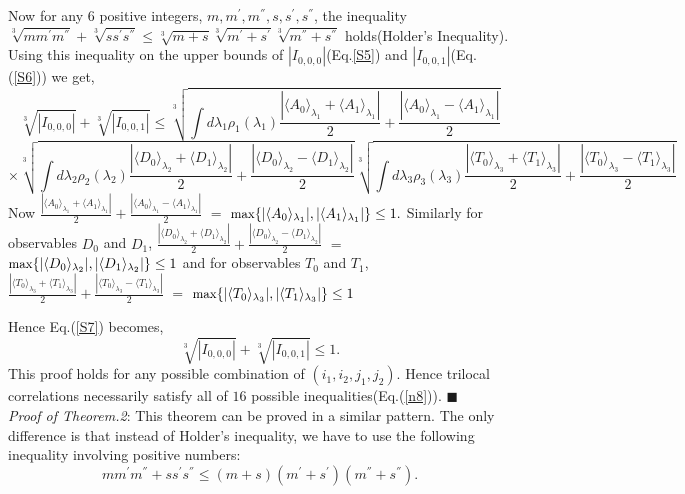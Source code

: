 \documentclass[pra,10pt,twocolumn,superscriptaddress,floatfix,showpacs]{revtex4-1}
\begin{document}
\begin{widetext}
\begin{equation}
\end{equation}
Now for any $6$ positive integers, $m,m^{'},m^{''},s,s^{'},s^{''}$, the inequality $\sqrt[3]{mm^{'}m^{''}}+\sqrt[3]{ss^{'}s^{''}}\leq\sqrt[3]{m+s}\sqrt[3]{m^{'}+s^{'}}\sqrt[3]{m^{''}+s^{''}}$ holds(Holder's Inequality).
 Using this inequality on the upper bounds of $|I_{0,0,0}|$(Eq.\ref{S5}) and $|I_{0,0,1}|$(Eq.(\ref{S6})) we get,
$$\sqrt[3]{|I_{0,0,0}|}+\sqrt[3]{|I_{0,0,1}|}\leq \sqrt[3]{\int d\lambda_1  \rho_1(\lambda_1)\frac{|\langle A_0\rangle_{\lambda_1}+\langle A_1\rangle_{\lambda_1}|}{2}+\frac{|\langle A_0\rangle_{\lambda_1}-\langle A_1\rangle_{\lambda_1}|}{2}}$$
\begin{equation}\label{S7}
\times\sqrt[3]{\int d\lambda_2  \rho_2(\lambda_2)\frac{|\langle D_0\rangle_{\lambda_2}+\langle D_1\rangle_{\lambda_2}|}{2}+\frac{|\langle D_0\rangle_{\lambda_2}-\langle D_1\rangle_{\lambda_2}|}{2}}\sqrt[3]{\int d\lambda_3  \rho_3(\lambda_3)\frac{|\langle T_0\rangle_{\lambda_3}+\langle T_1\rangle_{\lambda_3}|}{2}+\frac{|\langle T_0\rangle_{\lambda_3}-\langle T_1\rangle_{\lambda_3}|}{2}}
\end{equation}
Now $\frac{|\langle A_0\rangle_{\lambda_1}+\langle A_1\rangle_{\lambda_1}|}{2}+\frac{|\langle A_0\rangle_{\lambda_1}-\langle A_1\rangle_{\lambda_1}| }{2}$ $ =$ $\small{\textmd{max}}\{|\langle A_0\rangle_{\lambda_1}|,|\langle A_1\rangle_{\lambda_1}|\}\leq 1.$ Similarly for observables $D_0$ and $D_1$,  $\frac{|\langle D_0\rangle_{\lambda_2}+\langle D_1\rangle_{\lambda_2}|}{2}+\frac{|\langle D_0\rangle_{\lambda_2}-\langle D_1\rangle_{\lambda_2}|}{2}$ $=$ $\small{\textmd{max}}\{|\langle D_0\rangle_{\lambda_2}|,|\langle D_1\rangle_{\lambda_2}|\}\leq 1$ and for observables $T_0$ and $T_1$,  $\frac{|\langle T_0\rangle_{\lambda_3}+\langle T_1\rangle_{\lambda_3}|}{2}+\frac{|\langle T_0\rangle_{\lambda_3}-\langle T_1\rangle_{\lambda_3}|}{2}$ $=$ $\small{\textmd{max}}\{|\langle T_0\rangle_{\lambda_3}|,|\langle T_1\rangle_{\lambda_3}|\}\leq 1$
\end{widetext}
Hence Eq.(\ref{S7}) becomes,
\begin{equation}\label{S8}
    \sqrt[3]{|I_{0,0,0}|}+\sqrt[3]{|I_{0,0,1}|}\leq 1.
\end{equation}
This proof holds for any possible combination of $(i_1,i_2,j_1,j_2).$ Hence trilocal correlations necessarily satisfy all of $16$ possible inequalities(Eq.(\ref{n8})). $\blacksquare$\\
\textit{Proof of Theorem.2}: This theorem can be proved in a similar pattern. The only difference is that instead of Holder's inequality, we have to use the following inequality involving positive numbers:
\begin{equation}\label{l1}
    mm^{'}m^{''}+ss^{'}s^{''}\leq (m+s)(m^{'}+s^{'})(m^{''}+s^{''}).
\end{equation}
\end{document}
